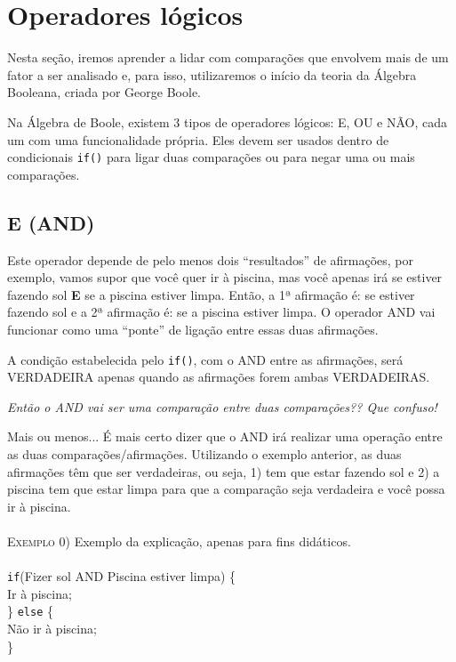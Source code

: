 \section{Operadores lógicos}
    Nesta seção, iremos aprender a lidar com comparações que envolvem mais de um fator a ser analisado e, para isso, utilizaremos o início da teoria da Álgebra Booleana, criada por George Boole. 
 
     Na Álgebra de Boole, existem 3 tipos de operadores lógicos: E, OU e NÃO, cada um com uma funcionalidade própria. Eles devem ser usados dentro de condicionais \texttt{if()} para ligar duas comparações ou para negar uma ou mais comparações.
 
\subsection{E (AND)}
 
    Este operador depende de pelo menos dois ``resultados'' de afirmações, por exemplo, vamos supor que você quer ir à piscina, mas você apenas irá se estiver fazendo sol \textbf{E} se a piscina estiver limpa. Então, a 1ª afirmação é: se estiver fazendo sol e a 2ª afirmação é: se a piscina estiver limpa. O operador AND vai funcionar como uma ``ponte'' de ligação entre essas duas afirmações. 
    
    \begin{center}
        A condição estabelecida pelo \texttt{if()}, com o AND entre as afirmações, será VERDADEIRA apenas quando as afirmações forem ambas VERDADEIRAS.
    \end{center}
    
    \textit{Então o AND vai ser uma comparação entre duas comparações?? Que confuso!}
    
    Mais ou menos... É mais certo dizer que o AND irá realizar uma operação entre as duas comparações/afirmações. Utilizando o exemplo anterior, as duas afirmações têm que ser verdadeiras, ou seja, 1) tem que estar fazendo sol e 2) a piscina tem que estar limpa para que a comparação seja verdadeira e você possa ir à piscina.
    \\
    \\
    \textsc{Exemplo 0)} Exemplo da explicação, apenas para fins didáticos.
    \\
    \\
    \texttt{if}(Fizer sol AND Piscina estiver limpa) \{\\
    \indent Ir à piscina;\\
    \} \texttt{else} \{\\
    \indent Não ir à piscina;\\
    \}
    
